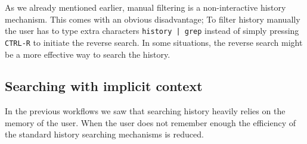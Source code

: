 As we already mentioned earlier, manual filtering is a non-interactive history mechanism. This comes with an obvious disadvantage; To filter history manually the user has to type extra characters \verb#history | grep# instead of simply pressing \verb|CTRL-R| to initiate the reverse search. In some situations, the reverse search might be a more effective way to search the history.







\subsection{Searching with implicit context}\label{workflow-search-w-implicit-context}
In the previous workflows we saw that searching history heavily relies on the memory of the user. When the user does not remember enough the efficiency of the standard history searching mechanisms is reduced.

